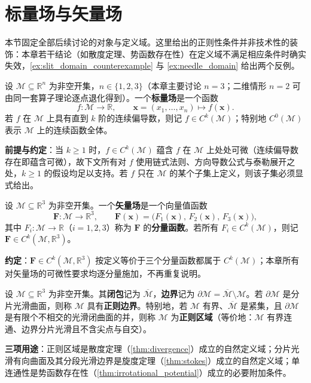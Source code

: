 \section{标量场与矢量场}

本节固定全部后续讨论的对象与定义域。这里给出的正则性条件并非技术性的装饰：本章若干结论（如散度定理、势函数存在性）在定义域不满足相应条件时确实失效，\cref{ex:slit_domain_counterexample} 与 \cref{ex:needle_domain} 给出两个反例。

\begin{definition}[标量场]\label{def:scalar_field}
设 $\mathcal{M} \subseteq \mathbb{R}^n$ 为非空开集，$n \in \{1,2,3\}$（本章主要讨论 $n=3$；二维情形 $n=2$ 可由同一套算子理论逐点退化得到）。一个\textbf{标量场}是一个函数
\[
f: \mathcal{M} \to \mathbb{R}, \qquad \mathbf{x} = (x_1, \dots, x_n) \mapsto f(\mathbf{x}).
\]
若 $f$ 在 $\mathcal{M}$ 上具有直到 $k$ 阶的连续偏导数，则记 $f \in C^k(\mathcal{M})$；特别地 $C^0(\mathcal{M})$ 表示 $\mathcal{M}$ 上的连续函数全体。

\textbf{前提与约定}：当 $k \ge 1$ 时，$f \in C^k(\mathcal{M})$ 蕴含 $f$ 在 $\mathcal{M}$ 上处处可微（连续偏导数存在即蕴含可微），故下文所有对 $f$ 使用链式法则、方向导数公式与泰勒展开之处，$k \ge 1$ 的假设均足以支持。若 $f$ 只在 $\mathcal{M}$ 的某个子集上定义，则该子集必须显式给出。
\end{definition}

\begin{definition}[矢量场]\label{def:vector_field}
设 $\mathcal{M} \subseteq \mathbb{R}^3$ 为非空开集。一个\textbf{矢量场}是一个向量值函数
\[
\mathbf{F}: \mathcal{M} \to \mathbb{R}^3, \qquad
\mathbf{F}(\mathbf{x}) = \bigl(F_1(\mathbf{x}),\, F_2(\mathbf{x}),\, F_3(\mathbf{x})\bigr),
\]
其中 $F_i: \mathcal{M} \to \mathbb{R}$（$i=1,2,3$）称为 $\mathbf{F}$ 的\textbf{分量函数}。若所有 $F_i \in C^k(\mathcal{M})$，则记 $\mathbf{F} \in C^k(\mathcal{M}, \mathbb{R}^3)$。

\textbf{约定}：$\mathbf{F} \in C^k(\mathcal{M},\mathbb R^3)$ 按定义等价于三个分量函数都属于 $C^k(\mathcal{M})$；本章所有对矢量场的可微性要求均逐分量施加，不再重复说明。
\end{definition}

\begin{definition}[闭包、边界、正则区域]\label{def:field_domain}
设 $\mathcal{M} \subseteq \mathbb{R}^3$ 为非空开集。其\textbf{闭包}记为 $\overline{\mathcal{M}}$，\textbf{边界}记为 $\partial \mathcal{M} = \overline{\mathcal{M}} \setminus \mathcal{M}$。若 $\partial \mathcal{M}$ 是分片光滑曲面，则称 $\mathcal{M}$ 具有\textbf{正则边界}。特别地，若 $\mathcal{M}$ 有界、$\overline{\mathcal M}$ 是紧集，且 $\partial \mathcal{M}$ 是有限个不相交的光滑闭曲面的并，则称 $\mathcal{M}$ 为\textbf{正则区域}（等价地：$\mathcal{M}$ 有界连通、边界分片光滑且不含尖点与自交）。

\textbf{三项用途}：正则区域是散度定理（\cref{thm:divergence}）成立的自然定义域；分片光滑有向曲面及其分段光滑边界是旋度定理（\cref{thm:stokes}）成立的自然定义域；单连通性是势函数存在性（\cref{thm:irrotational_potential}）成立的必要附加条件。
\end{definition}

